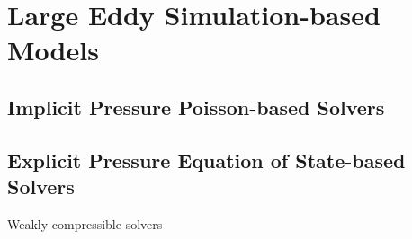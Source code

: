 \section{Large Eddy Simulation-based Models}
\subsection{Implicit Pressure Poisson-based Solvers}

\subsection{Explicit Pressure Equation of State-based Solvers}
Weakly compressible solvers